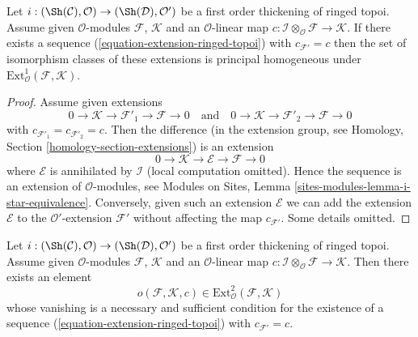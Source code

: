\begin{lemma}
\label{lemma-inf-ext-ringed-topoi}
Let $i : (\Sh(\mathcal{C}), \mathcal{O}) \to (\Sh(\mathcal{D}), \mathcal{O}')$
be a first order thickening of ringed topoi. Assume given
$\mathcal{O}$-modules $\mathcal{F}$, $\mathcal{K}$
and an $\mathcal{O}$-linear map
$c : \mathcal{I} \otimes_\mathcal{O} \mathcal{F} \to \mathcal{K}$.
If there exists a sequence (\ref{equation-extension-ringed-topoi}) with
$c_{\mathcal{F}'} = c$ then the set of isomorphism classes of these
extensions is principal homogeneous under
$\text{Ext}^1_\mathcal{O}(\mathcal{F}, \mathcal{K})$.
\end{lemma}

\begin{proof}
Assume given extensions
$$
0 \to \mathcal{K} \to \mathcal{F}'_1 \to \mathcal{F} \to 0
\quad\text{and}\quad
0 \to \mathcal{K} \to \mathcal{F}'_2 \to \mathcal{F} \to 0
$$
with $c_{\mathcal{F}'_1} = c_{\mathcal{F}'_2} = c$. Then the difference
(in the extension group, see
Homology, Section \ref{homology-section-extensions})
is an extension
$$
0 \to \mathcal{K} \to \mathcal{E} \to \mathcal{F} \to 0
$$
where $\mathcal{E}$ is annihilated by $\mathcal{I}$ (local computation
omitted). Hence the sequence is an extension of $\mathcal{O}$-modules,
see Modules on Sites, Lemma \ref{sites-modules-lemma-i-star-equivalence}.
Conversely, given such an extension $\mathcal{E}$ we can add the extension
$\mathcal{E}$ to the $\mathcal{O}'$-extension $\mathcal{F}'$ without
affecting the map $c_{\mathcal{F}'}$. Some details omitted.
\end{proof}

\begin{lemma}
\label{lemma-inf-obs-ext-ringed-topoi}
Let $i : (\Sh(\mathcal{C}), \mathcal{O}) \to (\Sh(\mathcal{D}), \mathcal{O}')$
be a first order thickening of ringed topoi. Assume given
$\mathcal{O}$-modules $\mathcal{F}$, $\mathcal{K}$
and an $\mathcal{O}$-linear map
$c : \mathcal{I} \otimes_\mathcal{O} \mathcal{F} \to \mathcal{K}$.
Then there exists an element
$$
o(\mathcal{F}, \mathcal{K}, c) \in
\text{Ext}^2_\mathcal{O}(\mathcal{F}, \mathcal{K})
$$
whose vanishing is a necessary and sufficient condition for the existence
of a sequence (\ref{equation-extension-ringed-topoi})
with $c_{\mathcal{F}'} = c$.
\end{lemma}

